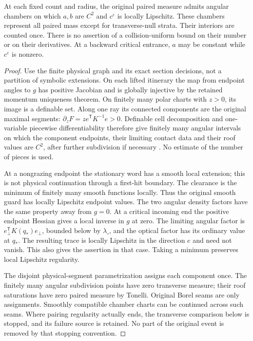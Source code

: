 \begin{lemma}\label{lem:v102-chambers}
At each fixed count and radius, the original paired measure admits
angular chambers on which $a,b$ are $C^2$ and $c^\varepsilon$ is
locally Lipschitz. These chambers represent all paired mass except
for transverse-null strata. Their interiors are counted once.
There is no assertion of a collision-uniform bound on their number
or on their derivatives. At a backward critical entrance, $a$ may be
constant while $c^\varepsilon$ is nonzero.
\end{lemma}
\begin{proof}
Use the finite physical graph and its exact section decisions, not a
partition of symbolic extensions. On each lifted itinerary the map
from endpoint angles to $g$ has positive Jacobian and is globally
injective by the retained momentum uniqueness theorem. On finitely
many polar charts with $z>0$, its image is a definable set. Along
one ray its connected components are the original maximal segments:
$\partial_zF=z e^{\mathsf T}K^{-1}e>0$. Definable cell decomposition
and one-variable piecewise differentiability therefore give finitely
many angular intervals on which the component endpoints, their
limiting contact data and their roof values are $C^2$, after further
subdivision if necessary \cite{Coste}. No estimate of the number of
pieces is used.

At a nongrazing endpoint the stationary word has a smooth local
extension; this is not physical continuation through a first-hit
boundary. The clearance is the minimum of finitely many smooth
functions locally. Thus the original smooth guard has locally
Lipschitz endpoint values. The two angular density factors have the
same property away from $g=0$. At a critical incoming end the
positive endpoint Hessian gives a local inverse in $g$ at zero.
The limiting angular factor is
$e_\perp^{\mathsf T}K(q_*)e_\perp$, bounded below by
$\lambda_\circ$, and the optical factor has its ordinary value at
$q_*$. The resulting trace is locally Lipschitz in the direction
$e$ and need not vanish. This also gives the assertion in that case.
Taking a minimum preserves local Lipschitz regularity.

The disjoint physical-segment parametrization assigns each component
once. The finitely many angular subdivision points have zero
transverse measure; their roof saturations have zero paired measure
by Tonelli. Original Borel seams are only assignments. Smoothly
compatible chamber charts can be continued across such seams.
Where pairing regularity actually ends, the transverse comparison
below is stopped, and its failure source is retained. No part of the
original event is removed by that stopping convention.
\end{proof}

